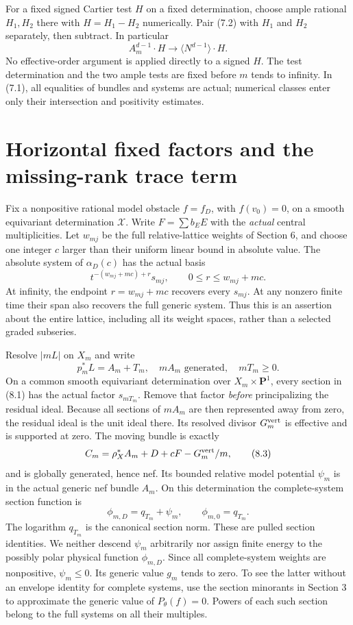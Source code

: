 \documentclass[10pt]{article}
\begin{document}
For a fixed signed Cartier test $H$ on a fixed determination, choose ample
rational $H_1,H_2$ there with $H=H_1-H_2$ numerically. Pair (7.2) with
$H_1$ and $H_2$ separately, then subtract. In particular
\[
 A_m^{d-1}\cdot H\longrightarrow
                  \langle N^{d-1}\rangle\cdot H.    \tag{7.3}
\]
No effective-order argument is applied directly to a signed $H$. The
test determination and the two ample tests are fixed before $m$ tends to
infinity. In (7.1), all equalities of bundles and systems are actual;
numerical classes enter only their intersection and positivity estimates.

\section{Horizontal fixed factors and the missing-rank trace term}
Fix a nonpositive rational model obstacle $f=f_D$, with $f(v_0)=0$, on a
smooth equivariant determination $\mathcal X$. Write
$F=\sum b_EE$ with the \emph{actual} central multiplicities. Let $w_{mj}$
be the full relative-lattice weights of Section 6, and choose one integer
$c$ larger than their uniform linear bound in absolute value. The absolute
system of $\alpha_D(c)$ has the actual basis
\[
 t^{-(w_{mj}+mc)+r}s_{mj},\qquad
                        0\leq r\leq w_{mj}+mc.      \tag{8.1}
\]
At infinity, the endpoint $r=w_{mj}+mc$ recovers every $s_{mj}$. At any
nonzero finite time their span also recovers the full generic system.
Thus this is an assertion about the entire lattice, including all its
weight spaces, rather than a selected graded subseries.

Resolve $|mL|$ on $X_m$ and write
\[
 p_m^*L=A_m+T_m,\quad mA_m\text{ generated},\quad mT_m\geq0.  \tag{8.2}
\]
On a common smooth equivariant determination over $X_m\times\mathbf P^1$,
every section in (8.1) has the actual factor $s_{mT_m}$. Remove that factor
\emph{before} principalizing the residual ideal. Because all sections of
$mA_m$ are then represented away from zero, the residual ideal is the unit
ideal there. Its resolved divisor $G_m^{\rm vert}$ is effective and is
supported at zero. The moving bundle is exactly
\[
 C_m=\rho_X^*A_m+D+cF-G_m^{\rm vert}/m,              \tag{8.3}
\]
and is globally generated, hence nef. Its bounded relative model
potential $\psi_m$ is in the actual generic nef bundle $A_m$. On this
determination the complete-system section function is
\[
 \phi_{m,D}=q_{T_m}+\psi_m,\qquad
                     \phi_{m,0}=q_{T_m}.            \tag{8.4}
\]
The logarithm $q_{T_m}$ is the canonical section norm. These are pulled
section identities. We neither descend $\psi_m$ arbitrarily nor assign
finite energy to the possibly polar physical function $\phi_{m,D}$.
Since all complete-system weights are nonpositive, $\psi_m\leq0$.
Its generic value $g_m$ tends to zero. To see the latter without an
envelope identity for complete systems, use the section minorants in
Section 3 to approximate the generic value of $P_\theta(f)=0$. Powers of
each such section belong to the full systems on all their multiples.
\end{document}
